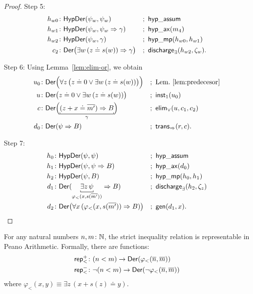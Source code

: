 \begin{proof}
    Step 5:
    \begin{align*}
        h_{w0}&\colon\fun{HypDer}(\psi_w,\psi_w)
            &&;\ \fun{hyp\_assum}\\
        h_{w1}&\colon\fun{HypDer}(\psi_w,\psi_w\imp\gamma)
            &&;\ \fun{hyp\_ax}(m_4)\\
        h_{w2}&\colon\fun{HypDer}(\psi_w,\gamma)
            &&;\ \fun{hyp\_mp}(h_{w0},h_{w1})\\
        c_2&\colon\fun{Der}\bigl(
            \exists w\,(z\doteq s(w))\imp\gamma
        \bigr)
            &&;\ \fun{discharge}_\exists(h_{w2},\zeta_w).
    \end{align*}

    Step 6: Using Lemma~\ref{lem:elim-or}, we obtain
    \begin{align*}
        u_0&\colon\fun{Der}\Bigl(
            \forall z\,\bigl(z\doteq 0\lor\exists w\,(z\doteq s(w))\bigr)
        \Bigr)
            &&;\ \text{Lem.~\ref{lem:predecesor}}\\
        u&\colon\fun{Der}\bigl(
            z\doteq 0\lor\exists w\,(z\doteq s(w))
        \bigr)
            &&;\ \fun{inst}_1(u_0)\\
        c&\colon\fun{Der}\Bigl(
            \explain[\gamma]{(z+x\doteq\num{m'})\imp B}
        \Bigr)
            &&;\ \fun{elim}_\lor(u,c_1,c_2)\\
        d_0&\colon\fun{Der}(\psi\imp B)
            &&;\ \fun{trans}_{\imp}(r,c).
    \end{align*}

    Step 7:
    \begin{align*}
        h_0&\colon\fun{HypDer}(\psi,\psi)
            &&;\ \fun{hyp\_assum}\\
        h_1&\colon\fun{HypDer}(\psi,\psi\imp B)
            &&;\ \fun{hyp\_ax}(d_0)\\
        h_2&\colon\fun{HypDer}(\psi,B)
            &&;\ \fun{hyp\_mp}(h_0,h_1)\\
        d_1&\colon\fun{Der}(
            \explain[\varphi_{<}(x,s(\num{m'}))]{
                \exists z\,\psi
            }
            \imp
            B
        )
            &&;\ \fun{discharge}_\exists(h_2,\zeta_z)\\
        d_2&\colon\fun{Der}\bigl(
            \forall x\,(\varphi_{<}(x,s(\num{m'}))\imp B)
        \bigr)
            &&;\ \fun{gen}(d_1,x).
    \end{align*}
\end{proof}

\begin{thm}
    \label{thm:representability-inequality}
    For any natural numbers\/ $n,m\colon\N$, the strict inequality relation is representable in Peano Arithmetic. Formally, there are functions:
    \begin{align*}
        \fun{rep}_{<}^+ &\colon (n < m) \to \fun{Der}(\varphi_<(\num{n}, \num{m}))\\
        \fun{rep}_{<}^- &\colon \neg(n < m) \to \fun{Der}(\neg\varphi_<(\num{n}, \num{m}))
    \end{align*}
    where\/ $\varphi_<(x,y) \equiv \exists z\,(x + s(z) \doteq y)$.
\end{thm}

